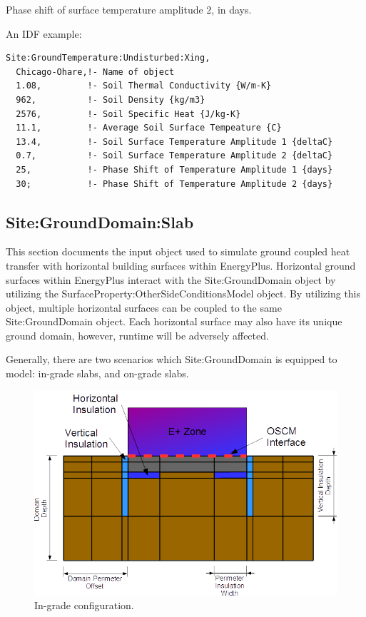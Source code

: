 Phase shift of surface temperature amplitude 2, in days.

An IDF example:

\begin{lstlisting}
Site:GroundTemperature:Undisturbed:Xing,
  Chicago-Ohare,!- Name of object
  1.08,         !- Soil Thermal Conductivity {W/m-K}
  962,          !- Soil Density {kg/m3}
  2576,         !- Soil Specific Heat {J/kg-K}
  11.1,         !- Average Soil Surface Tempeature {C}
  13.4,         !- Soil Surface Temperature Amplitude 1 {deltaC}
  0.7,          !- Soil Surface Temperature Amplitude 2 {deltaC}
  25,           !- Phase Shift of Temperature Amplitude 1 {days}
  30;           !- Phase Shift of Temperature Amplitude 2 {days}
\end{lstlisting}

\subsection{Site:GroundDomain:Slab}\label{sitegrounddomainslab}

This section documents the input object used to simulate ground coupled heat transfer with horizontal building surfaces within EnergyPlus. Horizontal ground surfaces within EnergyPlus interact with the Site:GroundDomain object by utilizing the SurfaceProperty:OtherSideConditionsModel object. By utilizing this object, multiple horizontal surfaces can be coupled to the same Site:GroundDomain object. Each horizontal surface may also have its unique ground domain, however, runtime will be adversely affected.

Generally, there are two scenarios which Site:GroundDomain is equipped to model: in-grade slabs, and on-grade slabs.

\begin{figure}[htbp]
\centering
\includegraphics{media/image012.png}
\caption{In-grade configuration. \protect \label{fig:in-grade-configuration}}
\end{figure}

